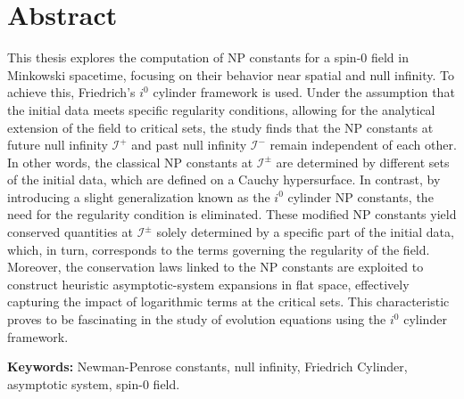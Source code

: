 
\section*{Abstract}


This thesis explores the computation of NP constants for a spin-0 field in Minkowski spacetime, focusing on their behavior near spatial and null infinity. To achieve this, Friedrich's $i^0$ cylinder framework is used. Under the assumption that the initial data meets specific regularity conditions, allowing for the analytical extension of the field to critical sets, the study finds that the NP constants at future null infinity $\mathscr{I}^{+}$ and past null infinity $\mathscr{I}^{-}$ remain independent of each other. In other words, the classical NP constants at $\mathscr{I}^{\pm}$ are determined by different sets of the initial data, which are defined on a Cauchy hypersurface.
In contrast, by introducing a slight generalization known as the $i^0$ cylinder NP constants, the need for the regularity condition is eliminated. These modified NP constants yield conserved quantities at $\mathscr{I}^{\pm}$ solely determined by a specific part of the initial data, which, in turn, corresponds to the terms governing the regularity of the field. Moreover, the conservation laws linked to the NP constants are exploited to construct heuristic asymptotic-system expansions in flat space, effectively capturing the impact of logarithmic terms at the critical sets. This characteristic proves to be fascinating in the study of evolution equations using the $i^0$ cylinder framework.

\vfill

\textbf{\Large Keywords:} Newman-Penrose constants, null infinity, Friedrich Cylinder, asymptotic system, spin-0 field.

